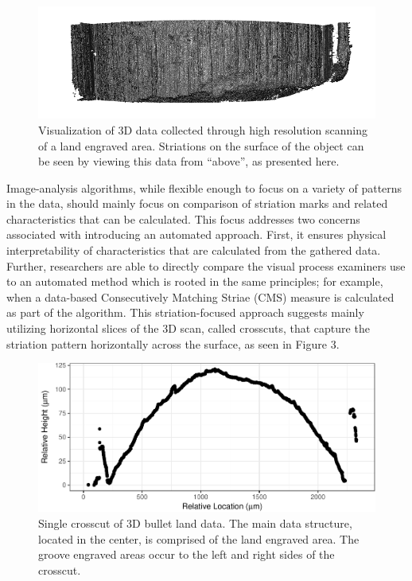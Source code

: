 \documentclass[]{article}
\begin{document}
\begin{figure}
\centering
\includegraphics[width=6.25000in]{./images/3d_plot_top.png}
\caption{Visualization of 3D data collected through high resolution
scanning of a land engraved area. Striations on the surface of the
object can be seen by viewing this data from ``above'', as presented
here.}
\end{figure}

Image-analysis algorithms, while flexible enough to focus on a variety
of patterns in the data, should mainly focus on comparison of striation
marks and related characteristics that can be calculated. This focus
addresses two concerns associated with introducing an automated
approach. First, it ensures physical interpretability of characteristics
that are calculated from the gathered data. Further, researchers are
able to directly compare the visual process examiners use to an
automated method which is rooted in the same principles; for example,
when a data-based Consecutively Matching Striae (CMS) measure is
calculated as part of the algorithm. This striation-focused approach
suggests mainly utilizing horizontal slices of the 3D scan, called
crosscuts, that capture the striation pattern horizontally across the
surface, as seen in Figure 3.

\begin{figure}
\centering
\includegraphics{writeup_files/figure-latex/unnamed-chunk-2-1.pdf}
\caption{Single crosscut of 3D bullet land data. The main data
structure, located in the center, is comprised of the land engraved
area. The groove engraved areas occur to the left and right sides of the
crosscut.}
\end{figure}
\end{document}
